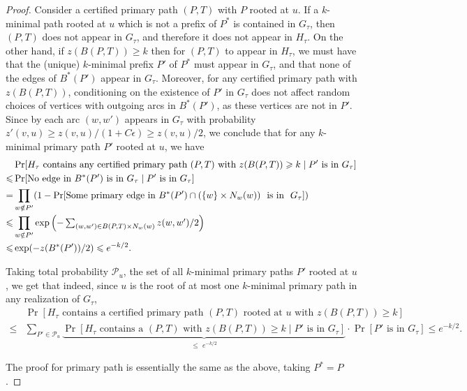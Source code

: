 \begin{proof}
Consider a certified primary path $(P,T)$ with $P$ rooted at $u$. If a $k$-minimal path rooted at $u$ which is not a prefix of $P^\ast$ is contained in $G_\tau$, then $(P,T)$ does not appear in $G_\tau$, and therefore it does not appear in $H_\tau$. On the other hand, 
if $z(B(P,T))\geq k$ then for $(P,T)$ to appear in $H_\tau$, we must have that the (unique) $k$-minimal prefix $P'$ of $P^\ast$ must appear in $G_\tau$, and that none of the edges of $B^\ast(P')$ appear in $G_\tau$. Moreover, for any certified primary path with $z(B(P,T))$, conditioning on the existence of $P'$ in $G_\tau$ does not affect random choices of vertices with outgoing arcs in $B^\ast(P')$, as these vertices are not in $P'$. Since by  each arc $(w,w')$ appears in $G_\tau$ with probability $z'(v,u) \geq z(v,u)/(1+C\epsilon)\geq z(v,u)/2$, we conclude that for any $k$-minimal primary path $P'$ rooted at $u$, we have
	\begin{align*}
	  &\Pr[H_\tau \text{ contains any certified primary path $(P,T)$ with $z(B(P,T)) \geq k$} \mid \text{$P'$ is in $G_\tau$}  ]\\ 
	\leq &\Pr[\text{No edge in $B^\ast(P')$ is in $G_\tau$} \mid  \text{$P'$ is in $G_\tau$}] \\
	= &\prod_{w \notin P'} (1 - \Pr[\text{Some primary edge in $B^\ast(P') \cap (\{w\} \times N_w(w))$ \text{ is in } $G_\tau$}]) \\
	\leq &\prod_{w \notin P'} \exp\left(\text{$-\textstyle\sum_{(w,w') \in B(P,T) \times N_w(w)} z(w,w')/2$}\right) \\
	\leq &\exp(-z(B^\ast(P'))/2) \leq e^{-k/2}.
	\end{align*}

	Taking total probability $\mathcal{P}_u$, the set of all $k$-minimal primary paths $P'$ rooted at $u$, we get that indeed, since $u$ is the root of at most one $k$-minimal primary path in any realization of $G_\tau$, 
	\begin{align*}
	  & \Pr[H_\tau \mbox{ contains a certified primary path $(P, T)$ rooted at $u$ with $z(B(P, T)) \geq k$}] \\
	 \leq & \sum_{P' \in \mathcal{P}_u} \underbrace{\Pr[\text{$H_\tau$ contains a $(P,T)$ with $z(B(P,T))\geq k$} \mid \text{$P'$ is in $G_\tau$}]}_{\leq \,\, e^{-k/2}} \cdot \Pr[\text{$P'$ is in $G_\tau$}]
	\leq e^{-k/2}.
	\end{align*}

	The proof for primary path is essentially the same as the above, taking $P^*=P$.
\end{proof}


